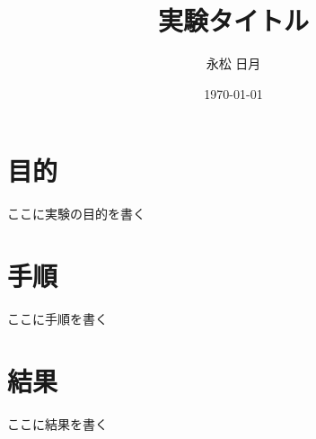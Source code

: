 \documentclass[a4paper,12pt]{article}
\title{実験タイトル}
\author{永松 日月}
\date{\today}
\begin{document}
\maketitle

\section*{目的}
ここに実験の目的を書く

\section*{手順}
ここに手順を書く

\section*{結果}
ここに結果を書く

% 


\end{document}

